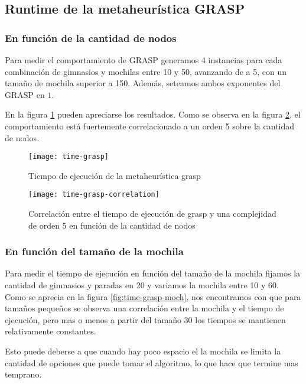 \subsection{Runtime de la metaheurística GRASP}
\label{sec:time-grasp}

\subsubsection{En función de la cantidad de nodos}

Para medir el comportamiento de GRASP generamos 4 instancias para cada combinación de gimnasios y mochilas entre 10 y 50, avanzando de a 5, con un tamaño de mochila superior a 150. Además, seteamos ambos exponentes del GRASP en $1$.

En la figura \ref{fig:time-grasp} pueden apreciarse los resultados. Como se observa en la figura \ref{fig:time-grasp-correlation}, el comportamiento está fuertemente correlacionado a un orden 5 sobre la cantidad de nodos.

\begin{figure}[H]
    \centering
    \texttt{[image: time-grasp]}
    \caption{Tiempo de ejecución de la metaheurística grasp}
    \label{fig:time-grasp}
\end{figure}

\begin{figure}[H]
    \centering
    \texttt{[image: time-grasp-correlation]}
    \caption{Correlación entre el tiempo de ejecución de grasp y una complejidad de orden 5 en función de la cantidad de nodos}
    \label{fig:time-grasp-correlation}
\end{figure}

\subsubsection{En función del tamaño de la mochila}

Para medir el tiempo de ejecución en función del tamaño de la mochila fijamos la cantidad de gimnasios y paradas en 20 y variamos la mochila entre 10 y 60. Como se aprecia en la figura \ref{fig:time-grasp-moch}, nos encontramos con que para tamaños pequeños se observa una correlación entre la mochila y el tiempo de ejecución, pero mas o menos a partir del tamaño 30 los tiempos se mantienen relativamente constantes.

Esto puede deberse a que cuando hay poco espacio el la mochila se limita la cantidad de opciones que puede tomar el algoritmo, lo que hace que termine mas temprano.

